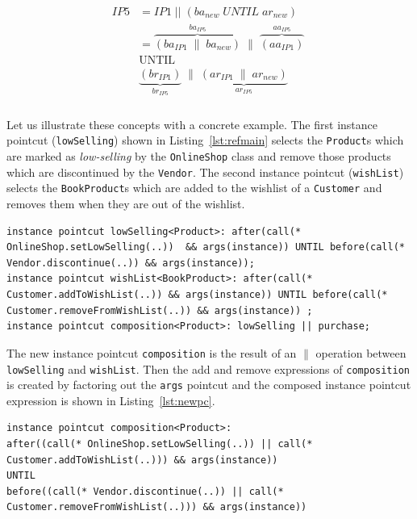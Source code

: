 \documentclass{llncs}
\begin{document}
\begin{align}
\begin{split}
IP5 & = IP1\;||\;(ba_{new}\;UNTIL\;ar_{new}) \\
   & = \overbrace{\left( ba_{IP1}\;\|\;ba_{new}\right)}^{ba_{IP5}}\;\|\;\overbrace{\left( aa_{IP1} \right)}^{aa_{IP5}}\;\\
&\textrm{UNTIL} \\
&\underbrace{\left( br_{IP1}\right)}_{br_{IP5}}\;\|\;\underbrace{\left( ar_{IP1}\;\|\;ar_{new} \right)}_{ar_{IP5}}\;\\  
\end{split}
\end{align}

Let us illustrate these concepts with a concrete example. The first instance pointcut  (\texttt{lowSelling})  shown in Listing~\ref{lst:refmain} selects the \texttt{Product}s which are marked as \emph{low-selling} by the \texttt{OnlineShop} class and remove those products which are discontinued by the \texttt{Vendor}. The second instance pointcut (\texttt{wishList})  selects the \texttt{BookProduct}s which are added to the wishlist of a \texttt{Customer} and removes them when they are out of the wishlist.

\begin{lstlisting}[float=h!, caption={Two instance pointcuts composed to obtain a new one}, label={lst:refmain}]
instance pointcut lowSelling<Product>: after(call(* OnlineShop.setLowSelling(..))  && args(instance)) UNTIL before(call(* Vendor.discontinue(..)) && args(instance));
instance pointcut wishList<BookProduct>: after(call(* Customer.addToWishList(..)) && args(instance)) UNTIL before(call(* Customer.removeFromWishList(..)) && args(instance)) ;
instance pointcut composition<Product>: lowSelling || purchase;
\end{lstlisting}

The new instance pointcut \texttt{composition} is the result of an $\|$ operation between \texttt{lowSelling} and \texttt{wishList}. Then the add and remove expressions of \texttt{composition} is created by factoring out the \texttt{args} pointcut and the composed instance pointcut expression is shown in Listing~\ref{lst:newpc}. 

\begin{lstlisting}[float=h!, caption={The new instance pointcut after composition}, label={lst:newpc}]
instance pointcut composition<Product>: 
after((call(* OnlineShop.setLowSelling(..)) || call(* Customer.addToWishList(..))) && args(instance)) 
UNTIL 
before((call(* Vendor.discontinue(..)) || call(* Customer.removeFromWishList(..))) && args(instance))
\end{lstlisting}
\end{document}
